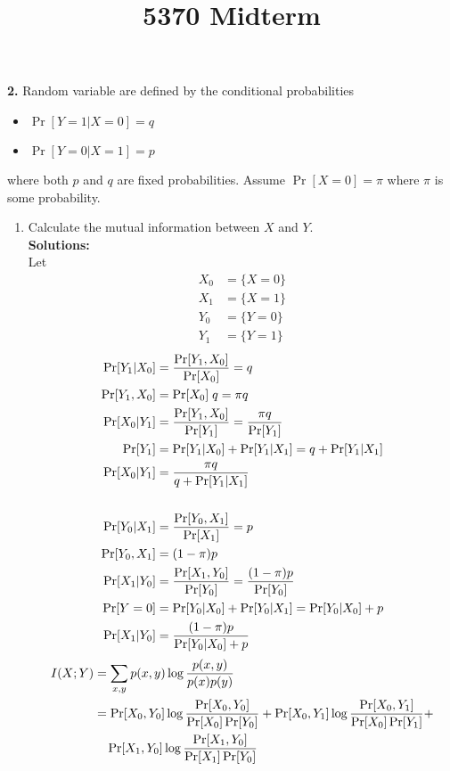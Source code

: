 \documentclass{assignment}
\begin{document}
\title{5370 Midterm}


\textbf{2.} Random variable are defined by the conditional probabilities
\begin{itemize}
\item  $\Pr[Y=1 | X=0] =q$
\item  $\Pr[Y=0 | X=1]=p$
\end{itemize}
where both $p$ and $q$ are fixed probabilities.
Assume $\Pr [X=0] =\pi $ where $\pi$ is some probability.
\begin{enumerate}
\item Calculate the mutual information between $X$ and $Y$.\\
  \textbf{Solutions:}\\
  Let
  \begin{align*}
    X_0 & = \{X=0\} \\
    X_1 & = \{X=1\} \\
    Y_0 & = \{Y=0\} \\
    Y_1 & = \{Y=1\}
  \end{align*}
  \begin{align*}
    \Pr[Y_1 | X_0] & = \dfrac{\Pr[Y_1, X_0]}{\Pr[X_0]} = q \\
    \Pr[Y_1, X_0] & = \Pr[X_0]\; q = \pi q \\
    \Pr[X_0 | Y_1] & = \dfrac{\Pr[Y_1, X_0]}{\Pr[Y_1]} = \dfrac{\pi q}{\Pr[Y_1]}\\
    \Pr[Y_1] & = \Pr[Y_1 | X_0] + \Pr[Y_1 | X_1] = q + \Pr[Y_1 | X_1]\\
    \Pr[X_0 | Y_1] & = \dfrac{\pi q}{q + \Pr[Y_1|X_1]} \\
    \\
    \Pr[Y_0 | X_1] & = \dfrac{\Pr[Y_0, X_1]}{\Pr[X_1]} = p \\
    \Pr[Y_0, X_1] & = (1-\pi) p \\
    \Pr[X_1 | Y_0] & = \dfrac{\Pr[X_1, Y_0]}{\Pr[Y_0]} = \dfrac{(1-\pi)p}{\Pr[Y_0]} \\
    \Pr[Y = 0] & = \Pr[Y_0 | X_0] + \Pr[Y_0 | X_1] = \Pr[Y_0 | X_0] + p\\
    \Pr[X_1|Y_0] & = \dfrac{(1-\pi) p }{\Pr[Y_0 | X_0] + p}
  \end{align*}
  \begin{align*}
    I(X;Y) & = \sum_{x,y}p(x, y) \log \df{p(x, y)}{p(x)p(y)} \\
           & = \Pr[X_0, Y_0] \log \df{\Pr[X_0, Y_0]}{\Pr[X_0]\Pr[Y_0]}
             + \Pr[X_0, Y_1] \log \df{\Pr[X_0, Y_1]}{\Pr[X_0]\Pr[Y_1]} +\\
           & \quad \Pr[X_1, Y_0] \log \df{\Pr[X_1, Y_0]}{\Pr[X_1]\Pr[Y_0]}

\end{align*}
\end{enumerate}
\end{document}
